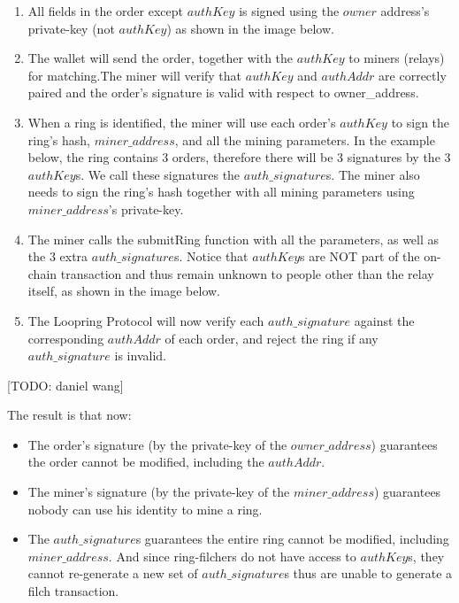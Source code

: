 \documentclass[UTF8,nofonts]{article}
\begin{document}
\begin{multicols}{2}
\begin{enumerate}
	\item All fields in the order except $authKey$ is signed using the $owner$ address's private-key (not $authKey$) as shown in the image below.

	\item The wallet will send the order, together with the $authKey$ to miners (relays) for matching.The miner will verify that $authKey$ and $authAddr$ are correctly paired and the order's signature is valid with respect to owner\_address.

	\item When a ring is identified, the miner will use each order's $authKey$ to sign the ring's hash, $miner\_address$, and all the mining parameters. In the example below, the ring contains 3 orders, therefore there will be 3 signatures by the 3 $authKey$s. We call these signatures the $auth\_signature$s. The miner also needs to sign the ring's hash together with all mining parameters using $miner\_address$'s private-key.

	\item The miner calls the submitRing function with all the parameters, as well as the 3 extra $auth\_signature$s. Notice that $authKey$s are NOT part of the on-chain transaction and thus remain unknown to people other than the relay itself, as shown in the image below.

	\item The Loopring Protocol will now verify each $auth\_signature$ against the corresponding $authAddr$ of each order, and reject the ring if any $auth\_signature$ is invalid.
 
\end{enumerate}
[TODO: daniel wang]


The result is that now:

\begin{itemize}

	\item  The order’s signature (by the private-key of the $owner\_address$) guarantees the order cannot be modified, including the $authAddr$.
	\item  The miner’s signature (by the private-key of the $miner\_address$) guarantees nobody can use his identity to mine a ring.
	\item  The $auth\_signature$s guarantees the entire ring cannot be modified, including $miner\_address$. And since ring-filchers do not have access to $authKey$s, they cannot re-generate a new set of $auth\_signature$s thus are unable to generate a filch transaction.


\end{itemize}
\end{multicols}
\end{document}

